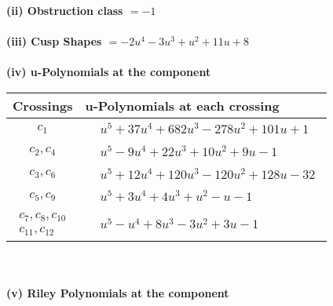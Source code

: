 \documentclass[1p]{elsarticle_modified}
\theoremstyle{definition}
\begin{document}
\flushleft \textbf{(ii) Obstruction class $= -1$}\\~\\
\flushleft \textbf{(iii) Cusp Shapes $= -2 u^4-3 u^3+u^2+11 u+8$}\\~\\
\newpage\renewcommand{\arraystretch}{1}
\flushleft \textbf{(iv) u-Polynomials at the component}\newline \\
\begin{tabular}{m{50pt}|m{274pt}}
Crossings & \hspace{64pt}u-Polynomials at each crossing \\
\hline $$\begin{aligned}c_{1}\end{aligned}$$&$\begin{aligned}
&u^5+37 u^4+682 u^3-278 u^2+101 u+1
\end{aligned}$\\
\hline $$\begin{aligned}c_{2},c_{4}\end{aligned}$$&$\begin{aligned}
&u^5-9 u^4+22 u^3+10 u^2+9 u-1
\end{aligned}$\\
\hline $$\begin{aligned}c_{3},c_{6}\end{aligned}$$&$\begin{aligned}
&u^5+12 u^4+120 u^3-120 u^2+128 u-32
\end{aligned}$\\
\hline $$\begin{aligned}c_{5},c_{9}\end{aligned}$$&$\begin{aligned}
&u^5+3 u^4+4 u^3+u^2- u-1
\end{aligned}$\\
\hline $$\begin{aligned}c_{7},c_{8},c_{10}\\c_{11},c_{12}\end{aligned}$$&$\begin{aligned}
&u^5- u^4+8 u^3-3 u^2+3 u-1
\end{aligned}$\\
\hline
\end{tabular}\\~\\
\newpage\renewcommand{\arraystretch}{1}
\flushleft \textbf{(v) Riley Polynomials at the component}\newline \\
\end{document}
